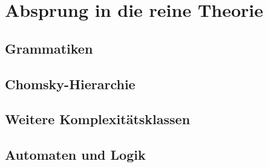 \chapter{Absprung in die reine Theorie}
\section{Grammatiken}\label{grammatiken}
\section{Chomsky-Hierarchie}\label{chomsky}

\section{Weitere Komplexitätsklassen}
\section{Automaten und Logik}
